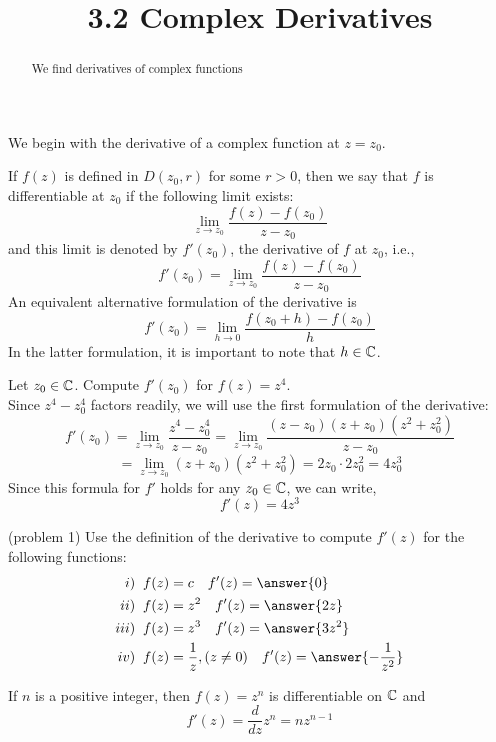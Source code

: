 \documentclass[handout]{ximera}
\title{3.2 Complex Derivatives}
\begin{document}
\begin{abstract}
We find derivatives of complex functions
\end{abstract}

\maketitle



We begin with the derivative of a complex function at $z = z_0$.

\begin{definition}
If $f(z)$ is defined in $D(z_0, r)$ for some $r>0$, then we say that $f$ is differentiable at $z_0$ if the following limit exists:
\[
\lim_{z \to z_0} \frac{f(z) - f(z_0)}{z-z_0}
\]
and this limit is denoted by $f'(z_0)$, the derivative of $f$ at $z_0$, i.e., 
\[
f'(z_0) = \lim_{z \to z_0} \frac{f(z) - f(z_0)}{z-z_0}
\]
An equivalent alternative formulation of the derivative is 
\[
f'(z_0) = \lim_{h \to 0} \frac{f(z_0 +h) -f(z_0)}{h}
\]
In the latter formulation, it is important to note that $h\in  \mathbb C$.
\end{definition}

\begin{example}[example 1]
Let $z_0 \in \mathbb C$. Compute $f'(z_0)$ for $f(z) = z^4$.\\
Since $z^4 - z_0^4$ factors readily, we will use the first formulation of the derivative:
\[
f'(z_0) =\lim_{z \to z_0} \frac{z^4 - z_0^4}{z-z_0} =\lim_{z \to z_0} \frac{(z-z_0)(z+z_0)(z^2+z_0^2)}{z-z_0}
\]
\[
= \lim_{z \to z_0} (z+z_0)(z^2+z_0^2) = 2z_0\cdot 2z_0^2 = 4z_0^3
\]
Since this formula for $f'$ holds for any $z_0 \in \mathbb C$, we can write,
\[
f'(z) = 4z^3
\]
\end{example}


\begin{problem}(problem 1)
Use the definition of the derivative to compute $f'(z)$ for the following functions:
\begin{align*}
i) \;\; &f(z) = c \quad f'(z) =\answer{0}\\
ii) \;\; &f(z) = z^2 \quad f'(z) =\answer{2z}\\
iii) \;\; &f(z) = z^3 \quad f'(z) =\answer{3z^2}\\
iv) \;\; & f(z) = \frac{1}{z}, (z \neq 0) \quad f'(z) =\answer{-\frac{1}{z^2}}
\end{align*}
\end{problem}

\begin{proposition}
If $n$ is a positive integer, then $f(z) = z^n$ is differentiable on $\mathbb C$ and
\[
f'(z) = \frac{d}{dz} z^n = nz^{n-1}
\]
\end{proposition}
\end{document}
